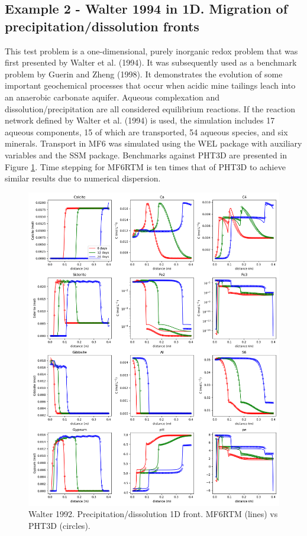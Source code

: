 \documentclass{article}
\begin{document}
\subsection{Example 2 - Walter 1994 in 1D. Migration of precipitation/dissolution fronts}

This test problem is a one-dimensional, purely inorganic redox problem that was first presented by Walter et al. (1994). It was subsequently used as a benchmark problem by Guerin and Zheng (1998). It demonstrates the evolution of some important geochemical processes that occur when acidic mine tailings leach into an anaerobic carbonate aquifer. Aqueous complexation and dissolution/precipitation are all considered equilibrium reactions. If the reaction network defined by Walter et al. (1994) is used, the simulation includes 17 aqueous components, 15 of which are transported, 54 aqueous species, and six minerals. Transport in MF6 was simulated using the WEL package with auxiliary variables and the SSM package. Benchmarks against PHT3D are presented in Figure \ref{fig:ex2}. Time stepping for MF6RTM is ten times that of PHT3D to achieve similar results due to numerical dispersion.

\begin{figure}[H]
\centering

    \includegraphics[width=\linewidth]{figures/ex2_10xtsteps.png}
\caption{Walter 1992. Precipitation/dissolution 1D front. MF6RTM (lines) vs PHT3D (circles).}
\label{fig:ex2}
\end{figure}
\end{document}
